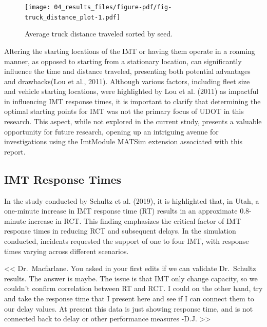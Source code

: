 \documentclass[fancy, oneside, mastersfancy, ms]{byuthesis}
\begin{document}
\begin{figure}

{\centering \texttt{[image: 04\_results\_files/figure-pdf/fig-truck\_distance\_plot-1.pdf]}

}

\caption{\label{fig-truck_distance_plot}Average truck distance traveled
sorted by seed.}

\end{figure}

Altering the starting locations of the IMT or having them operate in a
roaming manner, as opposed to starting from a stationary location, can
significantly influence the time and distance traveled, presenting both
potential advantages and drawbacks(Lou et al., 2011). Although various
factors, including fleet size and vehicle starting locations, were
highlighted by Lou et al. (2011) as impactful in influencing IMT
response times, it is important to clarify that determining the optimal
starting points for IMT was not the primary focus of UDOT in this
research. This aspect, while not explored in the current study, presents
a valuable opportunity for future research, opening up an intriguing
avenue for investigations using the ImtModule MATSim extension
associated with this report.

\hypertarget{imt-response-times}{%
\subsection{IMT Response Times}\label{imt-response-times}}

In the study conducted by Schultz et al. (2019), it is highlighted that,
in Utah, a one-minute increase in IMT response time (RT) results in an
approximate 0.8-minute increase in RCT. This finding emphasizes the
critical factor of IMT response times in reducing RCT and subsequent
delays. In the simulation conducted, incidents requested the support of
one to four IMT, with response times varying across different scenarios.

\textless\textless{} Dr.~Macfarlane. You asked in your first edits if we
can validate Dr.~Schultz results. The answer is maybe. The issue is that
IMT only change capacity, so we couldn't confirm correlation between RT
and RCT. I could on the other hand, try and take the response time that
I present here and see if I can connect them to our delay values. At
present this data is just showing response time, and is not connected
back to delay or other performance measures -D.J.
\textgreater\textgreater{}
\end{document}
